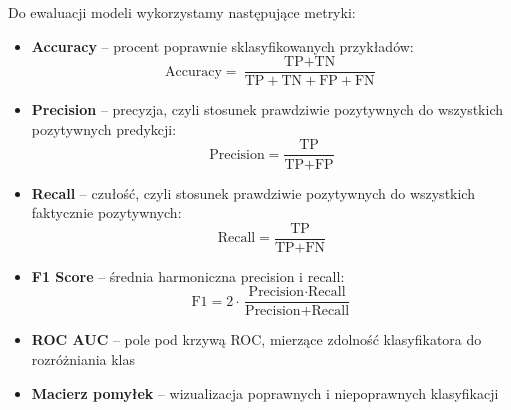 \documentclass[12pt,a4paper]{article}
\begin{document}
Do ewaluacji modeli wykorzystamy następujące metryki:
\begin{itemize}
    \item \textbf{Accuracy} -- procent poprawnie sklasyfikowanych przykładów:
    \begin{equation}
    \text{Accuracy} = \frac{\text{TP} + \text{TN}}{\text{TP} + \text{TN} + \text{FP} + \text{FN}}
    \end{equation}

    \item \textbf{Precision} -- precyzja, czyli stosunek prawdziwie pozytywnych do wszystkich pozytywnych predykcji:
    \begin{equation}
    \text{Precision} = \frac{\text{TP}}{\text{TP} + \text{FP}}
    \end{equation}

    \item \textbf{Recall} -- czułość, czyli stosunek prawdziwie pozytywnych do wszystkich faktycznie pozytywnych:
    \begin{equation}
    \text{Recall} = \frac{\text{TP}}{\text{TP} + \text{FN}}
    \end{equation}

    \item \textbf{F1 Score} -- średnia harmoniczna precision i recall:
    \begin{equation}
    \text{F1} = 2 \cdot \frac{\text{Precision} \cdot \text{Recall}}{\text{Precision} + \text{Recall}}
    \end{equation}

    \item \textbf{ROC AUC} -- pole pod krzywą ROC, mierzące zdolność klasyfikatora do rozróżniania klas
    \item \textbf{Macierz pomyłek} -- wizualizacja poprawnych i niepoprawnych klasyfikacji
\end{itemize}

\end{document}
